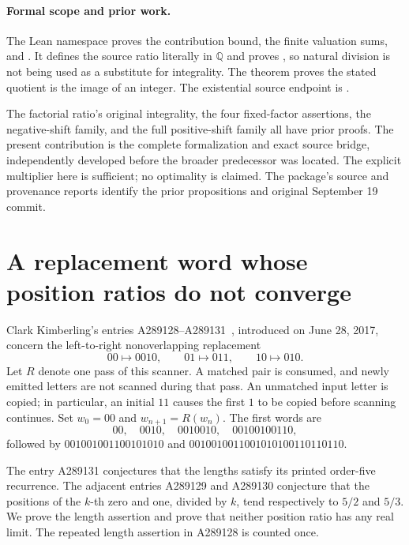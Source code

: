 \documentclass[11pt]{article}
\newcommand{\Q}{\mathbb Q}
\begin{document}
\paragraph{Formal scope and prior work.}
The Lean namespace  proves the contribution
bound, the finite valuation sums, and
. It defines the source ratio
literally in $\Q$ and proves , so natural
division is not being used as a substitute for integrality.
The theorem  proves the
stated quotient is the image of an integer. The existential source
endpoint is .

The factorial ratio's original integrality, the four fixed-factor
assertions, the negative-shift family, and the full positive-shift
family all have prior proofs. The present contribution is the
complete formalization and exact source bridge, independently
developed before the broader predecessor was located. The explicit
multiplier here is sufficient; no optimality is claimed. The
package's source and provenance reports identify the prior
propositions and original September 19 commit.

\section{A replacement word whose position ratios do not converge}
\label{sec:a289128}

Clark Kimberling's entries A289128--A289131~\cite{A289128,A289129,A289130,A289131}, introduced on June 28,
2017, concern the left-to-right nonoverlapping replacement
\[
00\longmapsto0010,\qquad01\longmapsto011,\qquad10\longmapsto010.
\]
Let $R$ denote one pass of this scanner. A matched pair is consumed,
and newly emitted letters are not scanned during that pass. An
unmatched input letter is copied; in particular, an initial $11$
causes the first $1$ to be copied before scanning continues. Set
$w_0=00$ and $w_{n+1}=R(w_n)$. The first words are
\[
00,\quad0010,\quad0010010,\quad00100100110,
\]
followed by $001001001100101010$ and
$0010010011001010100110110110$.

The entry A289131 conjectures that the lengths satisfy its printed
order-five recurrence. The adjacent entries A289129 and A289130
conjecture that the positions of the $k$-th zero and one, divided by
$k$, tend respectively to $5/2$ and $5/3$. We prove the length
assertion and prove that neither position ratio has any real limit.
The repeated length assertion in A289128 is counted once.
\end{document}
